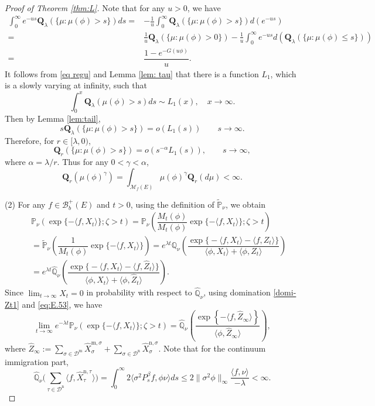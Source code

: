 \documentclass[12pt,a4paper]{amsart}
\numberwithin{equation}{section}
\theoremstyle{plain}
\theoremstyle{definition}
\theoremstyle{remark}
\begin{document}
\begin{proof}[Proof of Theorem \ref{thm:L}]
Note that for any $u>0$, we have
\begin{align}
\int_0^\infty e^{-us}{\mathbf Q}_\lambda(\{\mu: \mu(\phi)>s\})ds=&-\frac{1}{u}\int^\infty_0{\mathbf Q}_\lambda(\{\mu: \mu(\phi)>s\})d(e^{-us})\\
=&\frac{1}{u}{\mathbf Q}_\lambda(\{\mu: \mu(\phi)>0\})-\frac{1}{u}\int^\infty_0e^{-us}d({\mathbf Q}_\lambda(\{\mu: \mu(\phi)\le s\}))\\
=&\dfrac{1-e^{-G(u\phi)}}{u}.
\end{align}
It follows from  \eqref{eq regu} and Lemma \ref{lem: tau} that there is a function $L_1$, which is a slowly varying at infinity, such that
$$\int^x_0{\mathbf Q}_\lambda(\mu(\phi)>s)ds\sim L_1(x),\quad x\to\infty.$$
Then by Lemma \ref{lem:tail},
$$s{\mathbf Q}_\lambda(\{\mu: \mu(\phi)>s\})=o(L_1(s))\qquad s\to\infty.$$
Therefore, for $r\in[\lambda, 0)$,
\begin{equation}
{\mathbf Q}_r(\{\mu: \mu(\phi)>s\})=o(s^{-\alpha}L_1(s)),\qquad s\to\infty,
\end{equation}
where $\alpha=\lambda/r.$
Thus for any $0<\gamma<\alpha$,
\[
{\mathbf Q}_r\left(\mu(\phi)^{\gamma}\right)=\int_{{\mathcal M}_f(E)}\mu(\phi)^\gamma\mathbf Q_r(d\mu)<\infty.
\]

(2) For any $f\in\mathcal B_b^+(E)$ and $t>0$, using the definition of $\widetilde{\mathbb P}_\nu$, we obtain
\begin{eqnarray*}
&&\mathbb P_\nu\left(\exp\{-\langle f, X_t\rangle \};\zeta>t\right)
=\mathbb P_\nu\left(\dfrac{M_t(\phi)}{M_t(\phi)}\exp\{-\langle f, X_t\rangle \};\zeta>t\right)\\
&&=\widetilde{\mathbb P}_\nu\left(\dfrac{1}{M_t(\phi)}\exp\{-\langle f, X_t\rangle \}\right)
=e^{\lambda t}\mathbb Q_{\nu}\left(\dfrac{\exp\Big\{-\langle f, X_t\rangle -\langle f,  Z_t\rangle\Big \}}{\langle\phi, X_t\rangle +\langle\phi,  Z_t\rangle }\right)\\
&&=e^{\lambda t}\widehat{\mathbb Q}_{\nu}\left(\dfrac{\exp\Big\{-\langle f, X_t\rangle -\langle f,  \widehat Z_t\rangle\Big \}}{\langle\phi, X_t\rangle +\langle\phi,  \widehat Z_t\rangle }
\right).
\end{eqnarray*}
Since $\lim_{t\rightarrow\infty}X_t=0$ in probability with respect to $\widehat{\mathbb Q}_{\nu}$,  using domination \eqref{domi-Zt1} and \eqref{eq:E.53}, we have
\[
\lim_{t\to\infty}e^{-\lambda t}\mathbb P_\nu\left(\exp\{-\langle f, X_t\rangle \};\zeta>t\right)=\widehat{\mathbb Q}_{\nu}\left(\dfrac{\exp\left\{-\langle f,\widehat Z_\infty\rangle \right\}}{\langle \phi,\widehat Z_\infty\rangle}\right),
\]
where $\widehat Z_\infty:=\sum_{\sigma\in\mathcal D^{\mathrm m}}\widehat X^{{\mathrm m},\sigma}_\sigma+\sum_{\sigma\in\mathcal D^{\mathrm n}}\widehat X^{{\mathrm n},\sigma}_\sigma$.  Note that for the continuum immigration part,
\[
\widehat{\mathbb Q}_{\nu}\big(\sum_{\tau\in \mathcal D^{\mathrm n}}\langle f, \widehat X_{\tau}^{{\mathrm n},\tau} \rangle \big)
=\int_0^\infty2\langle \sigma^2 P^{\beta}_sf,\phi\nu\rangle ds
\leq 2\|\sigma^2\phi\|_\infty\dfrac{\langle f,\nu\rangle }{-\lambda}<\infty.
\]


\end{proof}
\end{document}
